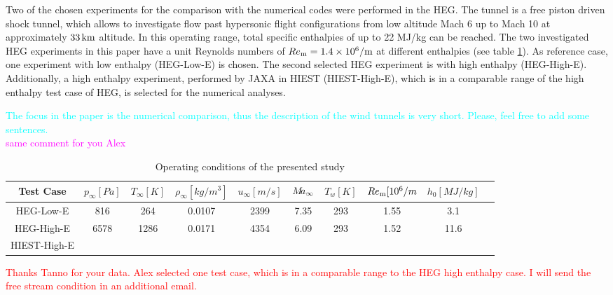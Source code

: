 \documentclass[]{aiaa-tc}%
\begin{document}
Two of the chosen experiments for the comparison with the numerical codes were performed in the HEG. The tunnel is a free piston driven shock tunnel, which allows to investigate flow past hypersonic flight configurations from low altitude Mach 6 up to Mach 10 at approximately $33 \hspace{0.05cm} \rm km$ altitude. In this operating range, total specific enthalpies of up to 22 MJ/kg can be reached.\cite{Hannemann_2008} The two investigated HEG experiments in this paper have a unit Reynolds numbers of $Re_{\rm m} = 1.4 \times 10^6 / \rm m$ at different enthalpies (see table \ref{tab:test_cases}). As reference case, one experiment with low enthalpy (HEG-Low-E) is chosen. The second selected HEG experiment is with high enthalpy (HEG-High-E). Additionally, a high enthalpy experiment, performed by JAXA in HIEST (HIEST-High-E), which is in a comparable range of the high enthalpy test case of HEG, is selected for the numerical analyses.

\textcolor{cyan}{The focus in the paper is the numerical comparison, thus the description of the wind tunnels is very short. Please, feel free to add some sentences.}\\
\textcolor{magenta}{same comment for you Alex}

\begin{table}[htbp]
	\centering
\begin{tabular}{c||c|c|c|c|c|c|c|c|c}%
 Test Case & $p_{\infty} [Pa] $&  $T_{\infty} [K] $  & $\rho_{\infty} [kg/m^3] $ & $u_{\infty} [m/s]$ & $M\hspace{-0.08cm}a_{\infty}$ & $T_w [K] $ & $Re_{\rm m} [10^6/m$ & $h_0 [MJ/kg]$ \\
\hline
\hline
\hspace{0.15cm} HEG-Low-E& \hspace{0.08cm} 816 & \hspace{0.08cm} 264 & 0.0107 &  2399 & 7.35   & 293 & 1.55 &\hspace{0.08cm} 3.1\\
\hline
\hspace{0.15cm} HEG-High-E& 6578  & 1286  & 0.0171 &  4354 &  6.09      & 293 & 1.52 & 11.6\\
\hline
HIEST-High-E&   &   &      & &  & & & \\
\end{tabular}
	\caption{Operating conditions of the presented study}
	\label{tab:test_cases}
\end{table}

\textcolor{red}{Thanks Tanno for your data. Alex selected one test case, which is in a comparable range to the HEG high enthalpy case. I will send the free stream condition in an additional email.}
\end{document}
